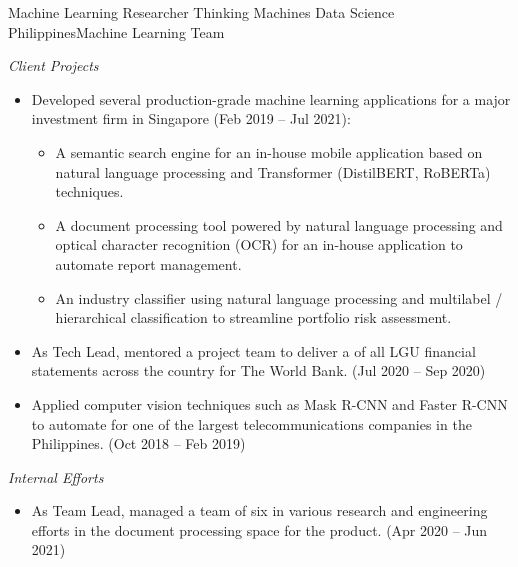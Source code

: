 \documentclass[12pt,a4paper]{moderncv}
\begin{document}
{Machine Learning Researcher}
{Thinking Machines Data Science}
{Philippines}{Machine Learning Team}
{
    \vspace{3px}
    \textit{Client Projects}
    \begin{itemize}
        \item Developed several production-grade machine learning applications
            for a major investment firm in Singapore (Feb 2019 -- Jul 2021): 
            \begin{itemize}
                \item A semantic search engine for an in-house mobile
                    application based on natural language processing and
                    Transformer (DistilBERT, RoBERTa) techniques. 
                \item A document processing tool powered by natural language
                    processing and optical character recognition (OCR) for an
                    in-house application to automate report management.
                \item An industry classifier using natural language processing
                    and multilabel / hierarchical classification to
                    streamline portfolio risk assessment. 
            \end{itemize}
        \item As Tech Lead, mentored a project team to deliver a {\color{blue}
            } of all LGU financial statements across the
            country for The World Bank.  (Jul 2020 -- Sep 2020)
        \item Applied computer vision techniques such as Mask R-CNN and Faster
        R-CNN to automate {\color{blue}}
        for one of the largest telecommunications companies in the Philippines.
        (Oct 2018 -- Feb 2019)
    \end{itemize}
    \vspace{3px}
    \textit{Internal Efforts}
    \begin{itemize}
        \item As Team Lead, managed a team of six in various research and
            engineering efforts in the document processing space for the
            {\color{blue}}
            product. (Apr 2020 -- Jun 2021)
    \end{itemize}
}
\end{document}
